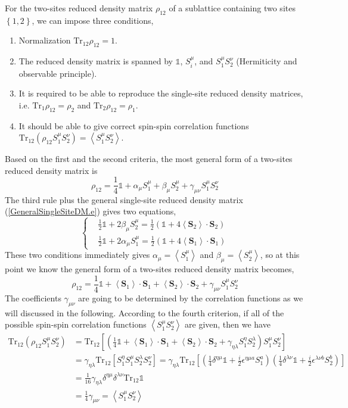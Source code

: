 \documentclass[12font]{article}
\theoremstyle{definition}
\numberwithin{equation}{section}
\newcommand{\anglelr}[1]{\left\langle #1 \right\rangle}
\newcommand{\lr}[1]{\left(  #1  \right)}
\newcommand{\lrm}[1]{\left[  #1  \right]}
\newcommand{\lrg}[1]{\left\{  #1  \right\}}
\newcommand{\mrm}[1]{\mathrm{#1}}
\newcommand{\bo}[1]{\mathbf{#1}}
\newcommand{\Tr}{\mrm{Tr}}
\begin{document}
For the two-sites reduced density matrix $\rho_{12}$ of a sublattice containing two sites $\lrg{1,2}$, we can impose three conditions,
\begin{enumerate}
  \item Normalization $\Tr_{12}\rho_{12} = 1$.
  \item The reduced density matrix is spanned by $\mathds{1}$, $S_i^\mu$, and $S_1^\mu S_2^\nu$ (Hermiticity and observable principle).
  \item It is required to be able to reproduce the single-site reduced density matrices, i.e. $\Tr_1\rho_{12} = \rho_2$ and $\Tr_2\rho_{12} = \rho_1$.
  \item It should be able to give correct spin-spin correlation functions $\Tr_{12}\lr{\rho_{12}S^\mu_1S^\nu_2} = \anglelr{S^\mu_1S^\nu_2}$.
\end{enumerate}
Based on the first and the second criteria, the most general form of a two-sites reduced density matrix is
\[
\rho_{12} = \frac{1}{4}\mathds{1} + \alpha_\mu S_1^{\mu} + \beta_\mu S_2^{\mu} + \gamma_{\mu\nu} S_1^{\mu}S_2^{\nu}
\]
The third rule plus the general single-site reduced density matrix (\ref{GeneralSingleSiteDM.e}) gives two equations,
\[
\left\{
\begin{aligned}
& \frac{1}{2}\mathds{1} + 2\beta_\mu S^\mu_2 = \frac{1}{2}\lr{\mathds{1} + 4\anglelr{\bo{S}_2}\cdot\bo{S}_2} \\
& \frac{1}{2}\mathds{1} + 2\alpha_\mu S^\mu_1 = \frac{1}{2}\lr{\mathds{1} + 4\anglelr{\bo{S}_1}\cdot\bo{S}_1}
\end{aligned}
\right.
\]
These two conditions immediately gives $\alpha_\mu = \anglelr{S_1^\mu}$ and $\beta_\mu = \anglelr{S_2^\mu}$, so at this point we know the general form of a two-sites reduced density matrix becomes,
\[
\rho_{12} = \frac{1}{4}\mathds{1} + \anglelr{\bo{S}_1}\cdot \bo{S}_1 + \anglelr{\bo{S}_2}\cdot \bo{S}_2 + \gamma_{\mu\nu} S_1^{\mu}S_2^{\nu}
\]
The coefficients $\gamma_{\mu\nu}$ are going to be determined by the correlation functions as we will discussed in the following. According to the fourth criterion, if all of the possible spin-spin correlation functions $\anglelr{S_1^\mu S_2^\nu}$ are given, then we have
\begin{align*}
  \Tr_{12}\lr{\rho_{12}S_1^\mu S_2^\nu} &= \Tr_{12}\lrm{\lr{\frac{1}{4}\mathds{1} + \anglelr{\bo{S}_1}\cdot \bo{S}_1 + \anglelr{\bo{S}_2}\cdot \bo{S}_2 + \gamma_{\eta\lambda} S_1^{\eta}S_2^{\lambda}}S_1^\mu S_2^\nu} \\
  &= \gamma_{\eta\lambda}\Tr_{12}\lrm{S_1^{\eta}S_1^\mu S_2^{\lambda}S_2^\nu} = \gamma_{\eta\lambda} \Tr_{12}\lrm{ \lr{\frac{1}{4}\delta^{\eta\mu}\mathds{1} + \frac{i}{2}\epsilon^{\eta\mu a}S^{a}_{1}} \lr{\frac{1}{4}\delta^{\lambda\nu}\mathds{1} + \frac{i}{2}\epsilon^{\lambda\nu b}S^{b}_{2}} } \\
  &= \frac{1}{16}\gamma_{\eta\lambda}\delta^{\eta\mu}\delta^{\lambda\nu} \Tr_{12}\mathds{1} \\
  &= \frac{1}{4}\gamma_{\mu\nu} = \anglelr{S^\mu_1 S^\nu_2}
\end{align*}
\end{document}
